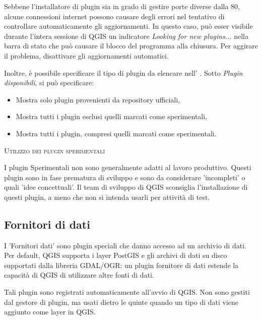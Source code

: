 Sebbene l'installatore di plugin sia in grado di gestire porte diverse dalla 80, alcune connessioni internet possono
causare degli errori nel tentativo di controllare automaticamente gli aggiornamenti. 
In questo caso, può esser visibile durante l'intera sessione di QGIS un indicatore \textit{Looking for new plugins...} 
nella barra di stato che può causare il blocco del programma alla chiusura.
Per aggirare il problema, disattivare gli aggiornamenti automatici.

Inoltre, è possibile specificare il tipo di plugin da elencare nell' . 
Sotto \textit{Plugin disponibili}, si può specificare:

\begin{itemize}[label=--]
\item Mostra solo plugin provenienti da repository ufficiali,
\item Mostra tutti i plugin esclusi quelli marcati come sperimentali,
\item Mostra tutti i plugin, compresi quelli marcati come sperimentali.
\end{itemize}

\begin{Tip}
 \caption{\textsc{Utilizzo dei plugin sperimentali}}
I plugin Sperimentali non sono generalmente adatti al lavoro produttivo. Questi plugin sono in fase prematura di sviluppo e 
sono da considerare 'incompleti' o quali 'idee concettuali'. Il team di sviluppo di QGIS sconsiglia l'installazione di 
questi plugin, a meno che non si intenda usarli per attività di test.
\end{Tip}

\subsection{Fornitori di dati}

I 'Fornitori dati' sono plugin speciali che danno accesso ad un archivio di dati. Per default, QGIS supporta i layer PostGIS
e gli archivi di dati su disco supportati dalla libreria GDAL/OGR: un plugin fornitore di dati estende la capacità di 
QGIS di utilizzare altre fonti di dati.

Tali plugin sono registrati automaticamente all'avvio di QGIS. Non sono gestiti dal gestore di plugin, 
ma usati dietro le quinte quando un tipo di dati viene aggiunto come layer in QGIS.

\FloatBarrier

